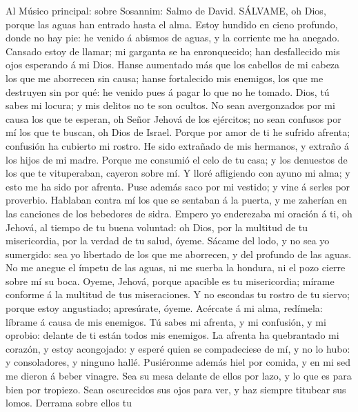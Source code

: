  Al Músico principal: sobre Sosannim: Salmo de David.
SÁLVAME, oh Dios, porque las aguas han entrado hasta el alma.
 Estoy hundido en cieno profundo, donde no hay pie: he
venido á abismos de aguas, y la corriente me ha anegado. 
Cansado estoy de llamar; mi garganta se ha enronquecido; han
desfallecido mis ojos esperando á mi Dios.  Hanse aumentado
más que los cabellos de mi cabeza los que me aborrecen sin causa; hanse
fortalecido mis enemigos, los que me destruyen sin por qué: he venido
pues á pagar lo que no he tomado.  Dios, tú sabes mi locura;
y mis delitos no te son ocultos.  No sean avergonzados por
mi causa los que te esperan, oh Señor Jehová de los ejércitos; no sean
confusos por mí los que te buscan, oh Dios de Israel. 
Porque por amor de ti he sufrido afrenta; confusión ha cubierto mi
rostro.  He sido extrañado de mis hermanos, y extraño á los
hijos de mi madre.  Porque me consumió el celo de tu casa; y
los denuestos de los que te vituperaban, cayeron sobre mí. 
Y lloré afligiendo con ayuno mi alma; y esto me ha sido por afrenta.
 Puse además saco por mi vestido; y vine á serles por
proverbio.  Hablaban contra mí los que se sentaban á la
puerta, y me zaherían en las canciones de los bebedores de sidra.
 Empero yo enderezaba mi oración á ti, oh Jehová, al tiempo
de tu buena voluntad: oh Dios, por la multitud de tu misericordia, por
la verdad de tu salud, óyeme.  Sácame del lodo, y no sea yo
sumergido: sea yo libertado de los que me aborrecen, y del profundo de
las aguas.  No me anegue el ímpetu de las aguas, ni me
suerba la hondura, ni el pozo cierre sobre mí su boca. 
Oyeme, Jehová, porque apacible es tu misericordia; mírame conforme á la
multitud de tus miseraciones.  Y no escondas tu rostro de
tu siervo; porque estoy angustiado; apresúrate, óyeme. 
Acércate á mi alma, redímela: líbrame á causa de mis enemigos.
 Tú sabes mi afrenta, y mi confusión, y mi oprobio: delante
de ti están todos mis enemigos.  La afrenta ha quebrantado
mi corazón, y estoy acongojado: y esperé quien se compadeciese de mí, y
no lo hubo: y consoladores, y ninguno hallé.  Pusiéronme
además hiel por comida, y en mi sed me dieron á beber vinagre.
 Sea su mesa delante de ellos por lazo, y lo que es para
bien por tropiezo.  Sean oscurecidos sus ojos para ver, y
haz siempre titubear sus lomos.  Derrama sobre ellos tu
